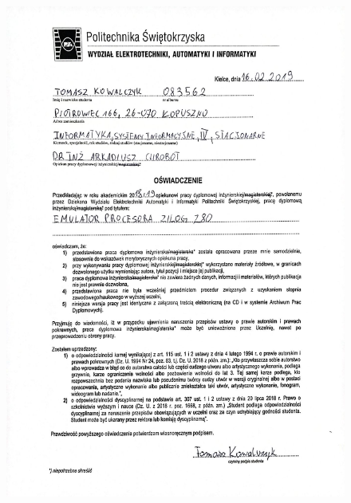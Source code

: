 \documentclass[12pt,a4paper]{report}
\begin{document}
	\begin{figure}[H]
		\vspace{-2.5cm}
		\hspace{-3.5cm}
		\includegraphics[width=1.0\paperwidth]{skany/osw.jpg}
	\end{figure}

	\leavevmode\thispagestyle{empty}\newpage
	
	
	
	\leavevmode\thispagestyle{empty}\newpage
	\leavevmode\thispagestyle{empty}\newpage
	
	\pagebreak
	\pagestyle{plain}
	\setcounter{page}{9} %
	\tableofcontents	 %
	
\end{document}
